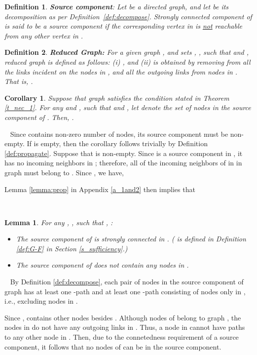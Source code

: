 \documentclass[letterpaper, 11pt]{article}
\newenvironment{proof}{\noindent {\bf Proof:}~}{\hspace*{\fill}}
\newtheorem{corollary}{Corollary}
\newtheorem{definition}{Definition}
\newtheorem{lemma}{Lemma}
\begin{document}
\begin{definition}
\label{def:source_comp}
{\bf Source component}:
Let  be a directed graph, and let  be its decomposition as per Definition~\ref{def:decompose}. Strongly connected component  of  is said to be a {\em source component} if the corresponding vertex  in  is \underline{not} reachable from any other vertex in . 
\end{definition}



\begin{definition}
\label{def:reduced} {\bf Reduced Graph:}
For a given graph , and sets ,
, such that  and , reduced
graph  is defined as
follows: (i)
, and (ii)  is obtained by removing from 
all the links incident on the nodes in , and all the outgoing links from nodes
in . 
That is, .
\end{definition}


\begin{corollary}
\label{cor:1:prop}
Suppose that graph  satisfies the condition stated in
Theorem \ref{t_nec_1}. For any 
and , such that  and
, let  denote the set of nodes in the source component of
.
Then, .\end{corollary}


\begin{proof}
Since  contains non-zero number of nodes, its source component  must be non-empty.
If  is empty, then the corollary follows trivially by Definition \ref{def:propagate}.
Suppose that  is non-empty.
Since  is a source component in , it has
no incoming neighbors in ; therefore, all of the incoming neighbors
of  in  in graph  must belong to . Since , we have,

Lemma \ref{lemma:prop} in Appendix \ref{a_1and2} then implies that

\end{proof}


~

\begin{lemma}
\label{l_connected}
For any , , such that , : \begin{itemize}
\item The source component of  is strongly connected in . ( is defined in Definition \ref{def:G-F} in Section \ref{s_sufficiency}.)
\item The source component of  does not contain any nodes in .
\end{itemize}
\end{lemma}

\begin{proof}
By Definition \ref{def:decompose}, each pair of nodes  in the source
component of graph  has at least one -path 
and at least one -path consisting of nodes only in ,
i.e., excluding nodes in .

Since ,  contains other nodes besides .
Although nodes of  belong to graph , the
nodes in  do not have any outgoing links in .
Thus, a node in  cannot have paths to any other node in .
Then, due to the connetedness requirement of a source component,
it follows that no nodes of  can be in the source component.
\end{proof}
\end{document}
